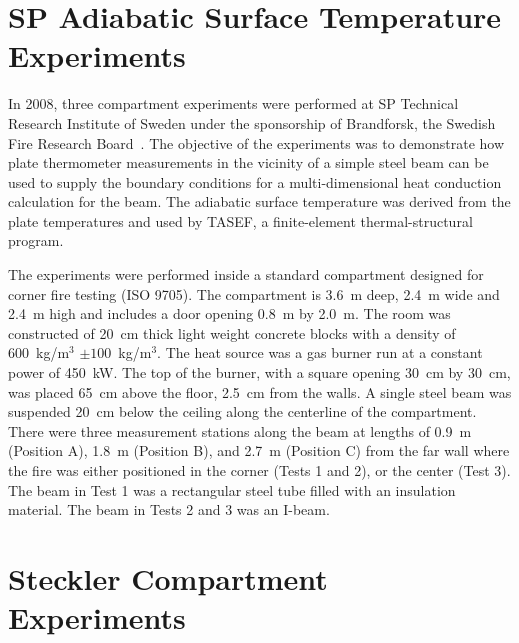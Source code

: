 \section{SP Adiabatic Surface Temperature Experiments}

In 2008, three compartment experiments were performed at SP Technical Research Institute of Sweden under the sponsorship of Brandforsk, the Swedish Fire Research Board~\cite{Wickstrom_AST}. The
objective of the experiments was to demonstrate how plate thermometer measurements in the vicinity of a simple steel beam can be used to supply the boundary conditions
for a multi-dimensional heat conduction calculation for the beam. The adiabatic surface temperature was derived from the plate temperatures and used by TASEF, a finite-element
thermal-structural program.

The experiments were performed inside a standard compartment designed for corner fire testing (ISO 9705).
The compartment is 3.6~m deep, 2.4~m wide and 2.4~m high and includes a door opening 0.8~m by 2.0~m. The room was constructed of 20~cm thick light weight concrete
blocks with a density of 600~kg/m$^3$ $\pm 100$~kg/m$^3$.
The heat source was a gas burner run at a constant power of 450~kW. The top of the burner, with a square opening 30~cm by 30~cm, was placed 65~cm above the floor, 2.5~cm from the walls.
A single steel beam was suspended 20~cm below the ceiling
along the centerline of the compartment. There were three measurement stations along the beam at lengths of 0.9~m (Position A), 1.8~m (Position B), and
2.7~m (Position C) from the far wall where the fire was either positioned in the corner (Tests 1 and 2), or the center (Test 3). The beam in Test 1 was
a rectangular steel tube filled with an insulation material. The beam in Tests 2 and 3 was an I-beam.




\section{Steckler Compartment Experiments}

